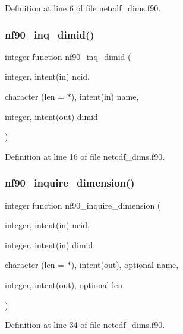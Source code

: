 Definition at line 6 of file netcdf\+\_\+dims.\+f90.

\mbox{\label{netcdf__dims_8f90_ae033acddda28173513d5f1144648f584}} 
\subsubsection{\texorpdfstring{nf90\+\_\+inq\+\_\+dimid()}{nf90\_inq\_dimid()}}
{\footnotesize\ttfamily integer function nf90\+\_\+inq\+\_\+dimid (\begin{DoxyParamCaption}\item[{integer, intent(in)}]{ncid,  }\item[{character (len = $\ast$), intent(in)}]{name,  }\item[{integer, intent(out)}]{dimid }\end{DoxyParamCaption})}



Definition at line 16 of file netcdf\+\_\+dims.\+f90.

\mbox{\label{netcdf__dims_8f90_abc57e344659c0939a0d9c39956fd59cd}} 
\subsubsection{\texorpdfstring{nf90\+\_\+inquire\+\_\+dimension()}{nf90\_inquire\_dimension()}}
{\footnotesize\ttfamily integer function nf90\+\_\+inquire\+\_\+dimension (\begin{DoxyParamCaption}\item[{integer, intent(in)}]{ncid,  }\item[{integer, intent(in)}]{dimid,  }\item[{character (len = $\ast$), intent(out), optional}]{name,  }\item[{integer, intent(out), optional}]{len }\end{DoxyParamCaption})}



Definition at line 34 of file netcdf\+\_\+dims.\+f90.

